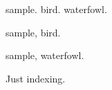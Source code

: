 \documentclass{article}
\begin{document}
\gls{sample}. \gls{bird}. \gls{waterfowl}.

\newpage

\gls{sample}, \gls{bird}.

\newpage

\gls{sample}, \gls{waterfowl}.

\newpage

Just indexing.

\newpage

\printunsrtglossaries
\end{document}
